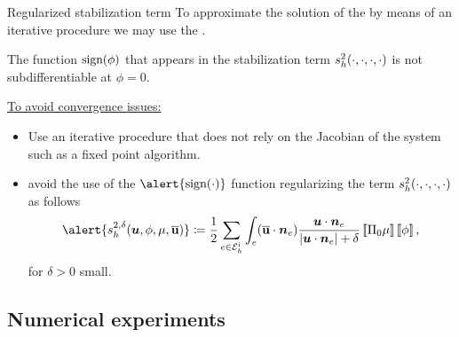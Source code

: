 \begin{frame}{Regularized stabilization term}
    \footnotesize
    To approximate the solution of the  by means of an iterative procedure we may use the .

    \vspace*{0.8\baselineskip}
	The function $\text{sign}(\phi)$ that appears in the stabilization term $s_h^2(\cdot,\cdot,\cdot,\cdot)$ is not subdifferentiable at $\phi=0$. \pause

  \vspace*{0.8\baselineskip}
  \underline{To avoid convergence issues:}
    \begin{itemize}
        \item<2> Use an iterative procedure that does not rely on the Jacobian of the system such as a fixed point algorithm.
        \item<3-4> avoid the use of the $\alert{\sign{\cdot}}$ function regularizing the term $s_h^2(\cdot,\cdot,\cdot,\cdot)$ as follows
        \begin{equation*}
            \label{cha6:def:regularization_sh}
            \alert{\shd{\uu}{\phi}{\mu}{\buu}}\coloneqq\frac{1}{2}\sum_{e\in\Ehi}\int_e(\buu\cdot\nn_e)\frac{\uu\cdot\nn_e}{\vert\uu\cdot\nn_e\vert+\delta}\salto{\Pi_0\mu}\salto{\phi},
        \end{equation*}
        for $\delta>0$ small. 
    \end{itemize}
\end{frame}

\subsection{Numerical experiments}

